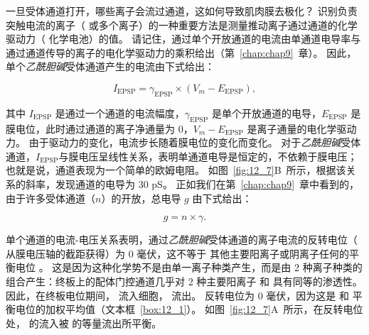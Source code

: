 一旦受体通道打开，哪些离子会流过通道，这如何导致肌肉膜去极化？
识别负责突触电流的离子（ 或多个离子）的一种重要方法是测量推动离子通过通道的化学驱动力（ 化学电池）的值。
请记住，通过单个开放通道的电流由单通道电导率与通过通道传导的离子的电化学驱动力的乘积给出（第~\ref{chap:chap9}~章）。 
因此，单个\textit{乙酰胆碱}受体通道产生的电流由下式给出：


\begin{equation}
	I_{\text{EPSP}} = \gamma_{\text{EPSP}}\times (V_m - E_{\text{EPSP}}),
\end{equation}


其中 $I_{\text{EPSP}}$ 是通过一个通道的电流幅度，$\gamma_{\text{EPSP}}$ 是单个开放通道的电导，$ E_{\text{EPSP}} $ 是膜电位，此时通过通道的离子净通量为 0，$V_m - E_{\text{EPSP}}$ 是离子通量的电化学驱动力。
由于驱动力的变化，电流步长随着膜电位的变化而变化。 
对于\textit{乙酰胆碱}受体通道，$I_{\text{EPSP}}$与膜电压呈线性关系，表明单通道电导是恒定的，不依赖于膜电压；
也就是说，通道表现为一个简单的欧姆电阻。
如图~\ref{fig:12_7}B~所示，根据该关系的斜率，发现通道的电导为 30 pS。
正如我们在第~\ref{chap:chap9}~章中看到的，由于许多受体通道（$n$）的开放，总电导 $g$ 由下式给出：


\begin{equation}
	g = n \times \gamma.
\end{equation}


单个通道的电流-电压关系表明，通过\textit{乙酰胆碱}受体通道的离子电流的反转电位（ 从膜电压轴的截距获得）为 0 毫伏，这不等于  其他主要阳离子或阴离子任何的平衡电位 。
这是因为这种化学势不是由单一离子种类产生，而是由 2 种离子种类的组合产生：终板上的配体门控通道几乎对 2 种主要阳离子  和  具有同等的渗透性。
因此，在终板电位期间， 流入细胞， 流出。
反转电位为 0 毫伏，因为这是  和  平衡电位的加权平均值（文本框~\ref{box:12_1}）。
如图~\ref{fig:12_7}A~所示，在反转电位处， 的流入被  的等量流出所平衡。


